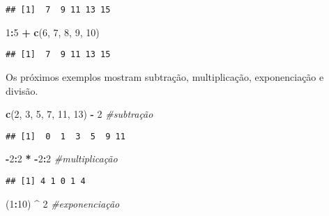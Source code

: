 \documentclass[
]{book}
\newenvironment{Shaded}{\begin{snugshade}}{\end{snugshade}}
\newcommand{\CommentTok}[1]{\textcolor[rgb]{0.56,0.35,0.01}{\textit{#1}}}
\newcommand{\DecValTok}[1]{\textcolor[rgb]{0.00,0.00,0.81}{#1}}
\newcommand{\FunctionTok}[1]{\textcolor[rgb]{0.13,0.29,0.53}{\textbf{#1}}}
\newcommand{\NormalTok}[1]{#1}
\newcommand{\SpecialCharTok}[1]{\textcolor[rgb]{0.81,0.36,0.00}{\textbf{#1}}}
\begin{document}
\begin{verbatim}
## [1]  7  9 11 13 15
\end{verbatim}

\begin{Shaded}
\begin{Highlighting}[]
\DecValTok{1}\SpecialCharTok{:}\DecValTok{5} \SpecialCharTok{+} \FunctionTok{c}\NormalTok{(}\DecValTok{6}\NormalTok{, }\DecValTok{7}\NormalTok{, }\DecValTok{8}\NormalTok{, }\DecValTok{9}\NormalTok{, }\DecValTok{10}\NormalTok{)}
\end{Highlighting}
\end{Shaded}

\begin{verbatim}
## [1]  7  9 11 13 15
\end{verbatim}

Os próximos exemplos mostram subtração, multiplicação, exponenciação e divisão.

\begin{Shaded}
\begin{Highlighting}[]
\FunctionTok{c}\NormalTok{(}\DecValTok{2}\NormalTok{, }\DecValTok{3}\NormalTok{, }\DecValTok{5}\NormalTok{, }\DecValTok{7}\NormalTok{, }\DecValTok{11}\NormalTok{, }\DecValTok{13}\NormalTok{) }\SpecialCharTok{{-}} \DecValTok{2}       \CommentTok{\#subtração}
\end{Highlighting}
\end{Shaded}

\begin{verbatim}
## [1]  0  1  3  5  9 11
\end{verbatim}

\begin{Shaded}
\begin{Highlighting}[]
\SpecialCharTok{{-}}\DecValTok{2}\SpecialCharTok{:}\DecValTok{2} \SpecialCharTok{*} \SpecialCharTok{{-}}\DecValTok{2}\SpecialCharTok{:}\DecValTok{2}                     \CommentTok{\#multiplicação}
\end{Highlighting}
\end{Shaded}

\begin{verbatim}
## [1] 4 1 0 1 4
\end{verbatim}

\begin{Shaded}
\begin{Highlighting}[]
\NormalTok{(}\DecValTok{1}\SpecialCharTok{:}\DecValTok{10}\NormalTok{) }\SpecialCharTok{\^{}} \DecValTok{2}                        \CommentTok{\#exponenciação}
\end{Highlighting}
\end{Shaded}
\end{document}

